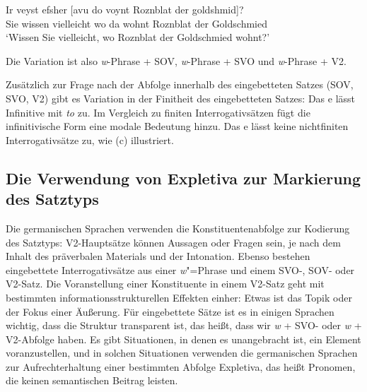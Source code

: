 \ea
\gll Ir veyst efsher [avu            do    voynt Roznblat   der goldshmid]?\footnotemark\\
     Sie wissen vielleicht \spacebr{}wo da wohnt Roznblat der Goldschmied\\
\glt `Wissen Sie vielleicht, wo Roznblat der Goldschmied wohnt?'
\z
%


\noindent
Die Variation ist also \emph{w}-Phrase + SOV, \emph{w}-Phrase + SVO und \emph{w}-Phrase + V2.\pagebreak

Zusätzlich zur Frage nach der Abfolge innerhalb des eingebetteten Satzes (SOV, SVO, V2) gibt es
Variation in der Finitheit des eingebetteten Satzes:
\eal
\label{ex-what-to-read}
\zl
Das e lässt Infinitive mit \emph{to} zu. Im Vergleich zu finiten Interrogativsätzen fügt die
infinitivische Form eine modale Bedeutung hinzu. Das e lässt keine nichtfiniten Interrogativsätze zu, wie
(c) illustriert.

\subsection{Die Verwendung von Expletiva zur Markierung des Satztyps}
\label{sec-phen-use-of-expletives}


Die germanischen Sprachen verwenden die Konstituentenabfolge zur Kodierung des Satztyps: V2-Hauptsätze können
Aussagen oder Fragen sein, je nach dem Inhalt des präverbalen Materials und der
Intonation. Ebenso bestehen eingebettete Interrogativsätze aus einer \emph{w}"=Phrase und einem SVO-, SOV-
oder V2-Satz. Die Voranstellung einer Konstituente in einem V2-Satz geht mit bestimmten informationsstrukturellen
Effekten einher: Etwas ist das Topik oder der Fokus einer Äußerung. Für eingebettete Sätze ist es in
einigen Sprachen wichtig, dass die Struktur transparent ist, das heißt, dass wir \emph{w} + SVO- oder
\emph{w} + V2-Abfolge haben. Es gibt Situationen, in denen es unangebracht ist, ein Element voranzustellen, und in
solchen Situationen verwenden die germanischen Sprachen zur Aufrechterhaltung einer
bestimmten Abfolge Expletiva, das heißt Pronomen, die keinen semantischen Beitrag leisten.

